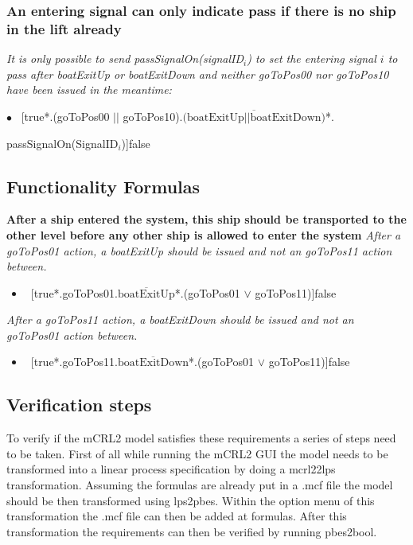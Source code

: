 \subsubsection{An entering signal can only indicate pass if there is no ship in the lift already}
\textit{It is only possible to send passSignalOn(signalID$_i$) to set the entering signal $i$ to pass after boatExitUp or boatExitDown and neither goToPos00 nor goToPos10 have been issued in the meantime:}\vspace{0.3cm}

	$\bullet$ ~[true*.(goToPos00 $||$ goToPos10).$\overline{\textrm{(boatExitUp} || \textrm{boatExitDown)}}$*.
		\begin{flushright}
			passSignalOn(SignalID$_i$)]false
		\end{flushright}
		
\subsection{Functionality Formulas}
\textbf{After a ship entered the system, this ship should be transported to the other level before any other ship is allowed to enter the system}
\textit{After a goToPos01 action, a boatExitUp should be issued and not an goToPos11 action between.}

\begin{itemize}
	\item ~[true*.goToPos01.$\overline{\textrm{boatExitUp}}$*.(goToPos01 $\vee$ goToPos11)]false
\end{itemize}

\noindent\textit{After a goToPos11 action, a boatExitDown should be issued and not an goToPos01 action between.}

\begin{itemize}
	\item ~[true*.goToPos11.$\overline{\textrm{boatExitDown}}$*.(goToPos01 $\vee$ goToPos11)]false
\end{itemize}

\subsection{Verification steps}
To verify if the mCRL2 model satisfies these requirements a series of steps need to be taken. First of all while running the mCRL2 GUI the model needs to be transformed into a linear process specification by doing a mcrl22lps transformation. Assuming the formulas are already put in a .mcf file the model should be then transformed using lps2pbes. Within the option menu of this transformation the .mcf file can then be added at formulas. After this transformation the requirements can then be verified by running pbes2bool.
\pagebreak
